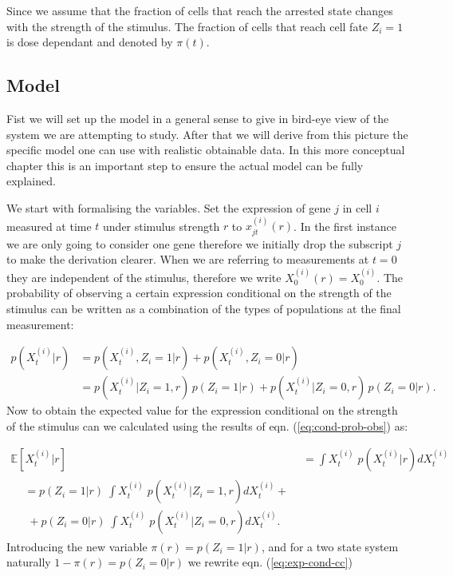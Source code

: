 Since we assume that the fraction of cells that reach the arrested state changes with the strength of the stimulus. The fraction of cells that reach cell fate $Z_i = 1$ is dose dependant and denoted by $\pi(t)$.

\subsection{Model}
\label{sec:model-cell}

Fist we will set up the model in a general sense to give in bird-eye view of the system we are attempting to study. After that we will derive from this picture the specific model one can use with realistic obtainable data. In this more conceptual chapter this is an important step to ensure the actual model can be fully explained.

We start with formalising the variables. Set the expression of gene $j$ in cell $i$ measured at time $t $ under stimulus strength $r$ to $x_{jt}^{(i)}(r)$. In the first instance we are only going to consider one gene therefore we initially drop the subscript $j$ to make the derivation clearer. When we are referring to measurements at $t=0$ they are independent of the stimulus, therefore we write $X_0^{(i)}(r) = X_0^{(i)}$. {\color{red} The probability of observing a certain expression conditional on the strength of the stimulus can be written as a combination of the types of populations at the final measurement}:

\begin{align}
  p(X_{t}^{(i)} | r) &= p(X_{t}^{(i)}, Z_i =1 | r) + p(X_{t}^{(i)}, Z_i =0 | r)\\
  &= p(X_{t}^{(i)}| Z_i =1,  r) \, p(Z_i =1 | r) + p(X_{t}^{(i)}| Z_i =0,  r) \, p(Z_i =0 | r).
  \label{eq:cond-prob-obs}
\end{align}
Now to obtain the expected value for the expression conditional on the strength of the stimulus can we calculated using the results of eqn. (\ref{eq:cond-prob-obs}) as:

\begin{align}
  \mathbb{E} [X_t^{(i)} | r] &= \int X_t^{(i)} \; p(X_t^{(i)}| r) dX_t^{(i)} \\
  \begin{split}
    &= p(Z_i = 1| r)\; \int X_t^{(i)} \; p(X_t^{(i)}|Z_i = 1, r) dX_t^{(i)} + \label{eq:exp-cond-cc} \\ 
    & \; + p(Z_i = 0| r)\; \int X_t^{(i)} \; p(X_t^{(i)}|Z_i = 0, r) dX_t^{(i)}.
  \end{split}
\end{align}
Introducing the new variable $\pi(r) = p(Z_i = 1 | r)$, and for a two state system naturally  $1 - \pi(r) = p(Z_i = 0 | r)$ we rewrite eqn. (\ref{eq:exp-cond-cc})

